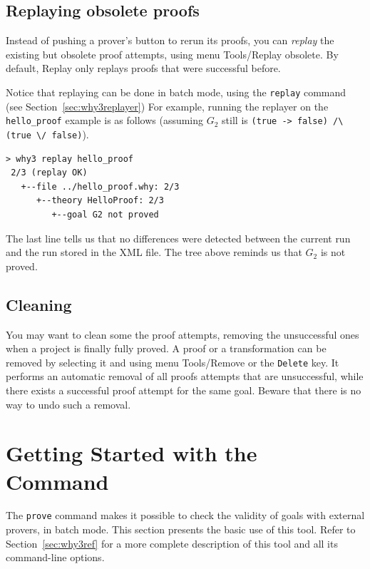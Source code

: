 \subsection{Replaying obsolete proofs}

Instead of pushing a prover's button to rerun its proofs, you can
\emph{replay} the existing but obsolete
proof attempts, using menu
\textsf{Tools/Replay obsolete}. By default, \textsf{Replay} only replays
proofs that were successful before.

Notice that replaying can be done in batch mode, using the
\texttt{replay} command (see Section~\ref{sec:why3replayer}) For
example, running the replayer on the \texttt{hello\_proof} example is
as follows (assuming $G_2$ still is
\lstinline|(true -> false) /\ (true \/ false)|).
\begin{verbatim}
> why3 replay hello_proof
 2/3 (replay OK)
   +--file ../hello_proof.why: 2/3
      +--theory HelloProof: 2/3
         +--goal G2 not proved
\end{verbatim}
The last line tells us that no differences were detected between the
current run and the run stored in the XML file. The tree above
reminds us that $G_2$ is not proved.

\subsection{Cleaning}

You may want to clean some the proof attempts, \eg removing the
unsuccessful ones when a project is finally fully proved.
A proof or a transformation can be removed by selecting it and
using menu \textsf{Tools/Remove} or the \texttt{Delete} key.
It performs an automatic removal of all proofs
attempts that are unsuccessful, while there exists a successful proof
attempt for the same goal.
Beware that there is no way to undo such a removal.

\section{Getting Started with the \why Command}
\label{sec:batch}

The \texttt{prove} command makes it possible to check the validity of goals with external
provers, in batch mode. This section presents the basic use of this
tool. Refer to Section~\ref{sec:why3ref} for a more complete
description of this tool and all its command-line options.

